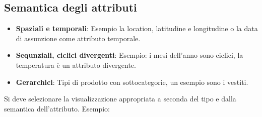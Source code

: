 \subsection{Semantica degli attributi}
\begin{itemize}
    \item \textbf{Spaziali e temporali}: Esempio la location, latitudine e longitudine o la data di assunzione come attributo temporale.
    \item \textbf{Sequnziali, ciclici divergenti}: Esempio: i mesi dell'anno sono ciclici, la temperatura è un attributo divergente.
    \item \textbf{Gerarchici}: Tipi di prodotto con sottocategorie, un esempio sono i vestiti.
\end{itemize}
Si deve selezionare la visualizzazione appropriata a seconda del tipo e dalla semantica dell'attributo.
Esempio:
